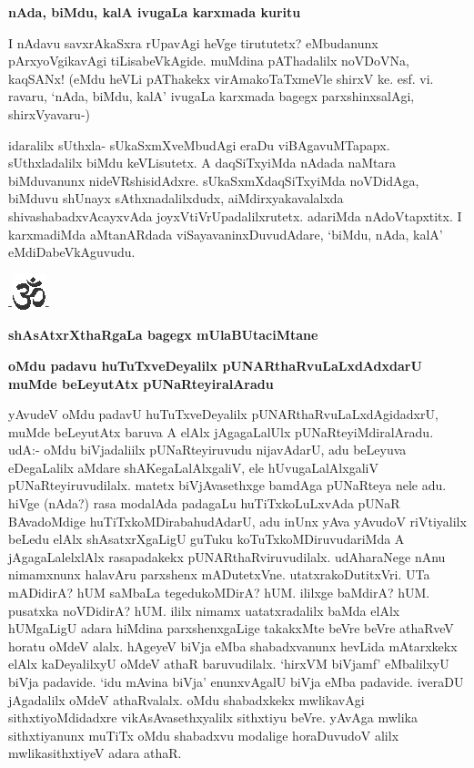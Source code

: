 {\bf nAda, biMdu, kalA ivugaLa karxmada kuritu}

I nAdavu savxrAkaSxra rUpavAgi heVge tirututetx? eMbudanunx pArxyoVgikavAgi tiLisabeVkAgide. muMdina pAThadalilx noVDoVNa, kaqSANx! (eMdu heVLi pAThakekx virAmakoTaTxmeVle shirxV ke. esf. vi. ravaru, `nAda, biMdu, kalA' ivugaLa karxmada bagegx parxshinxsalAgi, shirxVyavaru-)

idaralilx sUthxla- sUkaSxmXveMbudAgi eraDu viBAgavuMTapapx. sUthxladalilx biMdu keVLisutetx. A daqSiTxyiMda nAdada naMtara biMduvanunx nideVRshisidAdxre. sUkaSxmXdaqSiTxyiMda noVDidAga, biMduvu shUnayx sAthxnadalilxdudx, aiMdirxyakavalalxda shivashabadxvAcayxvAda joyxVtiVrUpadalilxrutetx. adariMda nAdoVtapxtitx. I karxmadiMda aMtanARdada viSayavaninxDuvudAdare, `biMdu, nAda, kalA' eMdiDabeVkAguvudu.

\begin{center}
-\includegraphics{om.eps}-
\end{center}

\medskip
\begin{center}
{\bf\Large{shAsAtxrXthaRgaLa bagegx mUlaBUtaciMtane}}
\end{center}

{\bf oMdu padavu huTuTxveDeyalilx pUNARthaRvuLaLxdAdxdarU muMde beLeyutAtx pUNaRteyiralAradu}

yAvudeV oMdu padavU huTuTxveDeyalilx pUNARthaRvuLaLxdAgidadxrU, muMde beLeyutAtx baruva A elAlx jAgagaLalUlx pUNaRteyiMdiralAradu. udA:- oMdu biVjadaliilx pUNaRteyiruvudu nijavAdarU, adu beLeyuva eDegaLalilx aMdare shAKegaLalAlxgaliV, ele hUvugaLalAlxgaliV pUNaRteyiruvudilalx. matetx biVjAvasethxge bamdAga pUNaRteya nele adu. hiVge (nAda?) rasa modalAda padagaLu huTiTxkoLuLxvAda pUNaR BAvadoMdige huTiTxkoMDirabahudAdarU, adu inUnx yAva yAvudoV riVtiyalilx beLedu elAlx shAsatxrXgaLigU guTuku koTuTxkoMDiruvudariMda A jAgagaLalelxlAlx rasapadakekx pUNARthaRviruvudilalx. udAharaNege nAnu nimamxnunx halavAru parxshenx mADutetxVne. utatxrakoDutitxVri. UTa mADidirA? hUM saMbaLa tegedukoMDirA? hUM. ililxge baMdirA? hUM. pusatxka noVDidirA? hUM. ililx nimamx uatatxradalilx baMda elAlx hUMgaLigU adara hiMdina parxshenxgaLige takakxMte beVre beVre athaRveV horatu oMdeV alalx. hAgeyeV biVja eMba shabadxvanunx hevLida mAtarxkekx elAlx kaDeyalilxyU oMdeV athaR baruvudilalx. `hirxVM biVjamf' eMbalilxyU biVja padavide. `idu mAvina biVja' enunxvAgalU biVja eMba padavide. iveraDU jAgadalilx oMdeV athaRvalalx. oMdu shabadxkekx mwlikavAgi sithxtiyoMdidadxre vikAsAvasethxyalilx sithxtiyu beVre. yAvAga mwlika sithxtiyanunx muTiTx oMdu shabadxvu modalige horaDuvudoV alilx mwlikasithxtiyeV adara athaR.

